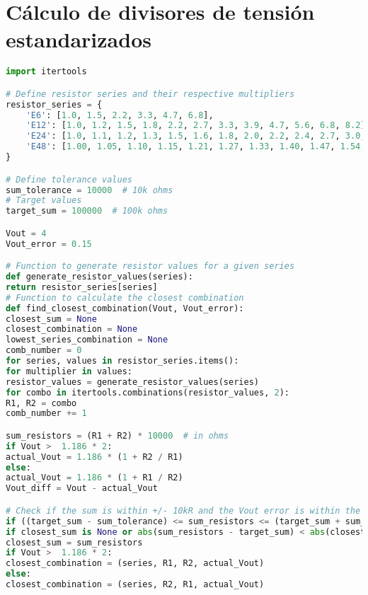 \section{Cálculo de divisores de tensión estandarizados}

\begin{lstlisting}[language=Python, basicstyle=\ttfamily\small, breaklines=true, frame=single]
import itertools

# Define resistor series and their respective multipliers
resistor_series = {
	'E6': [1.0, 1.5, 2.2, 3.3, 4.7, 6.8],
	'E12': [1.0, 1.2, 1.5, 1.8, 2.2, 2.7, 3.3, 3.9, 4.7, 5.6, 6.8, 8.2],
	'E24': [1.0, 1.1, 1.2, 1.3, 1.5, 1.6, 1.8, 2.0, 2.2, 2.4, 2.7, 3.0, 3.3, 3.6, 3.9, 4.3, 4.7, 5.1, 5.6, 6.2, 6.8, 7.5, 8.2, 9.1],
	'E48': [1.00, 1.05, 1.10, 1.15, 1.21, 1.27, 1.33, 1.40, 1.47, 1.54, 1.62, 1.69, 1.78, 1.87, 1.96, 2.05, 2.15, 2.26, 2.37, 2.49, 2.61, 2.74, 2.87, 3.01, 3.16, 3.32, 3.48, 3.65, 3.83, 4.02, 4.22, 4.42, 4.64, 4.87, 5.11, 5.36, 5.62, 5.90, 6.19, 6.49, 6.81, 7.15, 7.50, 7.87, 8.25, 8.66, 9.09],
}

# Define tolerance values
sum_tolerance = 10000  # 10k ohms
# Target values
target_sum = 100000  # 100k ohms

Vout = 4
Vout_error = 0.15

# Function to generate resistor values for a given series
def generate_resistor_values(series):
return resistor_series[series]
# Function to calculate the closest combination
def find_closest_combination(Vout, Vout_error):
closest_sum = None
closest_combination = None
lowest_series_combination = None
comb_number = 0
for series, values in resistor_series.items():
for multiplier in values:
resistor_values = generate_resistor_values(series)
for combo in itertools.combinations(resistor_values, 2):
R1, R2 = combo
comb_number += 1

sum_resistors = (R1 + R2) * 10000  # in ohms
if Vout >  1.186 * 2:
actual_Vout = 1.186 * (1 + R2 / R1)
else:
actual_Vout = 1.186 * (1 + R1 / R2)
Vout_diff = Vout - actual_Vout

# Check if the sum is within +/- 10kR and the Vout error is within the specified tolerance
if ((target_sum - sum_tolerance) <= sum_resistors <= (target_sum + sum_tolerance)) and (Vout_diff <= Vout_error and Vout_diff > 0):
if closest_sum is None or abs(sum_resistors - target_sum) < abs(closest_sum - target_sum):
closest_sum = sum_resistors
if Vout >  1.186 * 2:
closest_combination = (series, R1, R2, actual_Vout)
else:
closest_combination = (series, R2, R1, actual_Vout)


\end{lstlisting}
